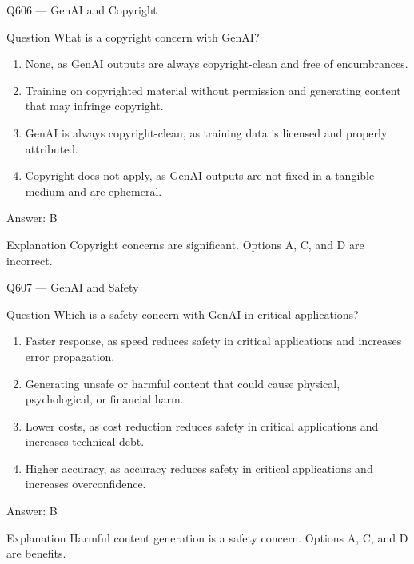 \documentclass[aspectratio=169,8pt]{beamer}
\begin{document}
	\begin{frame}{Q606 --- GenAI and Copyright}
		\begin{block}{Question}
			What is a copyright concern with GenAI?
			\begin{enumerate}
				\item None, as GenAI outputs are always copyright-clean and free of encumbrances.
				\item Training on copyrighted material without permission and generating content that may infringe copyright.
				\item GenAI is always copyright-clean, as training data is licensed and properly attributed.
				\item Copyright does not apply, as GenAI outputs are not fixed in a tangible medium and are ephemeral.
			\end{enumerate}
		\end{block}
		\begin{exampleblock}{Answer: B}\end{exampleblock}
		\begin{block}{Explanation}
			Copyright concerns are significant. Options A, C, and D are incorrect.
		\end{block}
	\end{frame}
	
	\begin{frame}{Q607 --- GenAI and Safety}
		\begin{block}{Question}
			Which is a safety concern with GenAI in critical applications?
			\begin{enumerate}
				\item Faster response, as speed reduces safety in critical applications and increases error propagation.
				\item Generating unsafe or harmful content that could cause physical, psychological, or financial harm.
				\item Lower costs, as cost reduction reduces safety in critical applications and increases technical debt.
				\item Higher accuracy, as accuracy reduces safety in critical applications and increases overconfidence.
			\end{enumerate}
		\end{block}
		\begin{exampleblock}{Answer: B}\end{exampleblock}
		\begin{block}{Explanation}
			Harmful content generation is a safety concern. Options A, C, and D are benefits.
		\end{block}
	\end{frame}
	
\end{document}
